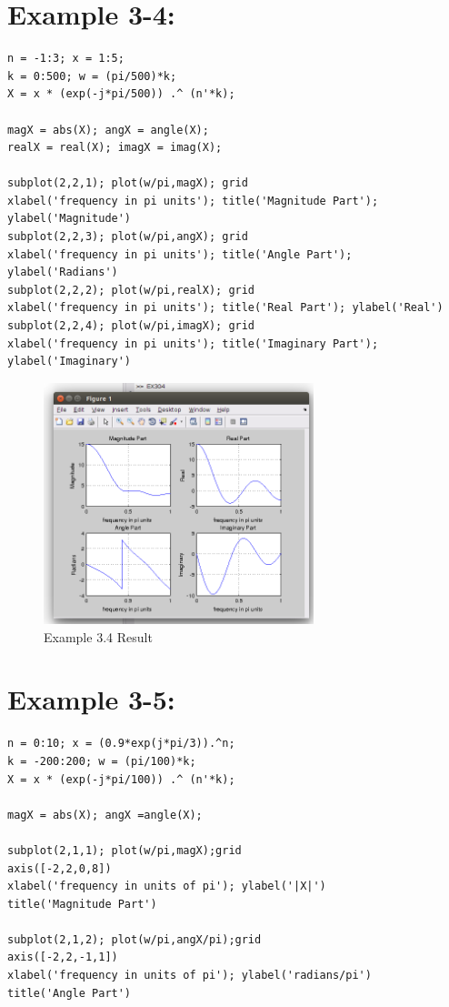 \documentclass[11pt
  , a4paper
  , article
  , oneside
]{memoir}
\begin{document}
\chapter{Example 3-4:}

\begin{lstlisting}[style=termstyle]
% Example 3.4:
n = -1:3; x = 1:5; 
k = 0:500; w = (pi/500)*k; 
X = x * (exp(-j*pi/500)) .^ (n'*k); 

magX = abs(X); angX = angle(X);
realX = real(X); imagX = imag(X);

subplot(2,2,1); plot(w/pi,magX); grid
xlabel('frequency in pi units'); title('Magnitude Part'); ylabel('Magnitude')
subplot(2,2,3); plot(w/pi,angX); grid
xlabel('frequency in pi units'); title('Angle Part'); ylabel('Radians')
subplot(2,2,2); plot(w/pi,realX); grid
xlabel('frequency in pi units'); title('Real Part'); ylabel('Real')
subplot(2,2,4); plot(w/pi,imagX); grid
xlabel('frequency in pi units'); title('Imaginary Part'); ylabel('Imaginary')
\end{lstlisting}

\begin{figure}[h!]
	\centering
	\includegraphics[width=0.7\textwidth,height=0.5\textwidth]{./images/Ex3-4.png}
	\caption{Example 3.4 Result}
	\label{fig:Example 3-4 Result}
\end{figure}

\clearpage

\chapter{Example 3-5:}
\begin{lstlisting}[style=termstyle]
%Example 3.5
n = 0:10; x = (0.9*exp(j*pi/3)).^n;
k = -200:200; w = (pi/100)*k;
X = x * (exp(-j*pi/100)) .^ (n'*k);

magX = abs(X); angX =angle(X);

subplot(2,1,1); plot(w/pi,magX);grid
axis([-2,2,0,8])
xlabel('frequency in units of pi'); ylabel('|X|')
title('Magnitude Part')

subplot(2,1,2); plot(w/pi,angX/pi);grid
axis([-2,2,-1,1])
xlabel('frequency in units of pi'); ylabel('radians/pi')
title('Angle Part')
\end{lstlisting}
\end{document}
